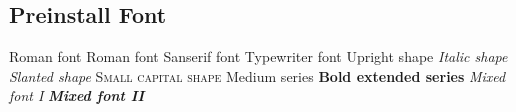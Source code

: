 \documentclass{article}
\begin{document}
        \subsection{Preinstall Font}
            \textrm{Roman font}\newline
            {\rmfamily Roman font}\newline              %
            {\sffamily Sanserif font}\newline           %
            {\ttfamily Typewriter font}\newline         %
            {\upshape Upright shape}\newline            %
            {\itshape Italic shape}\newline             %
            {\slshape Slanted shape}\newline            %
            {\scshape Small capital shape}\newline      %
            {\mdseries Medium series}\newline           %
            {\bfseries Bold extended series}\newline    %
            {\rmfamily\slshape\mdseries Mixed font I}\newline
            \textsf\textit\textbf{Mixed font II}\newline    %
\end{document}
